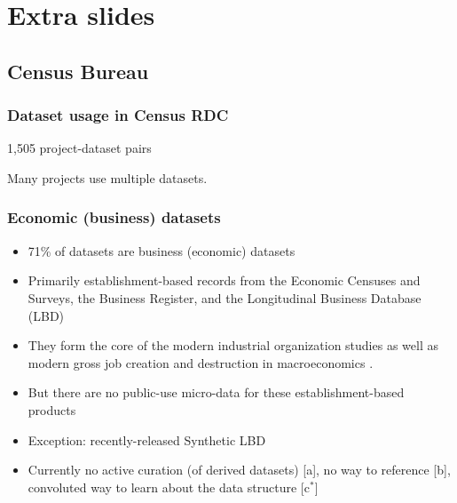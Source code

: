 
\section{Extra slides}
\frame{\tableofcontents[currentsection]}

\subsection{Census Bureau}
\begin{frame}[label=Census]
\frametitle{Dataset usage in Census RDC}
\begin{block}{1,505 project-dataset pairs}
\centering
\end{block}
\tiny Many projects use multiple datasets.
\end{frame}

\begin{frame}
\frametitle{Economic (business) datasets}
\begin{itemize}
\item 71\% of datasets are business (economic) datasets
\item Primarily establishment-based records from the
Economic Censuses and Surveys, the Business Register, and the Longitudinal Business Database (LBD)
\item They form the core of the modern
industrial organization studies \cite%
{DunneRobertsSamuelson1989,OlleyPakes1996} as well as modern gross job
creation and destruction in macroeconomics \cite%
{DavisHaltiwangerSchuh,HaltiwangerJarminMiranda2010}.
\item But there are no public-use micro-data for these establishment-based products
\item Exception: recently-released Synthetic LBD \cite%
{AbowdVilhuber2010,KinneyEtAl2011}
\item Currently no active curation (of derived datasets) [a], no way to reference [b], convoluted way to learn about the data structure [c$^*$]
\end{itemize}
\end{frame}

